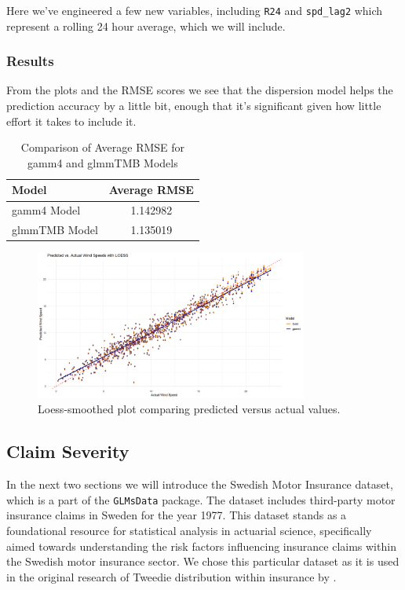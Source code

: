 \documentclass[12pt, twoside,hidelinks]{article}
\theoremstyle{definition}
\numberwithin{equation}{section}
\begin{document}
Here we've engineered a few new variables, including \texttt{R24} and \texttt{spd\_lag2} which represent a rolling 24 hour average, which we will include. 

\subsubsection{Results}

From the plots and the RMSE scores we see that the dispersion model helps the prediction accuracy by a little bit, enough that it's significant given how little effort it takes to include it. 

\begin{table}[H]
\centering
\begin{tabular}{lc}
\toprule
\textbf{Model} & \textbf{Average RMSE} \\
\midrule
gamm4 Model & 1.142982 \\
glmmTMB Model & 1.135019 \\
\bottomrule
\end{tabular}
\caption{Comparison of Average RMSE for gamm4 and glmmTMB Models}
\label{tab:average_rmse_comparison}
\end{table}

\begin{figure}
    \centering
\includegraphics[width=0.8\textwidth]{visuals/wind_model_speed/loess_wind3.png}
\caption*{Loess-smoothed plot comparing predicted versus actual values.}
\label{fig:hist_pred_errors}
\end{figure}



\subsection{Claim Severity}\label{sec:analysis:claim_severity}

In the next two sections we will introduce the Swedish Motor Insurance dataset, which is a part of the \texttt{GLMsData} package. The dataset includes third-party motor insurance claims in Sweden for the year 1977. This dataset stands as a foundational resource for statistical analysis in actuarial science, specifically aimed towards understanding the risk factors influencing insurance claims within the Swedish motor insurance sector.
We chose this particular dataset as it is used in the original research of Tweedie distribution within insurance by \citet{JorgensenDeSouza1994}. 
\newline
\end{document}
